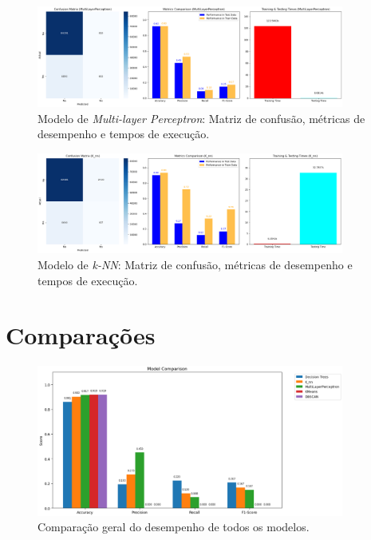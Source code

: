 \begin{figure}[H]
    \centering
    \includegraphics[width=0.9\textwidth]{images/mlp_overview.png}
    \caption{Modelo de \textit{Multi-layer Perceptron}: Matriz de confusão, métricas de desempenho e tempos de execução.}
    \label{fig:mlp_overview}
\end{figure}

\begin{figure}[H]
    \centering
    \includegraphics[width=0.9\textwidth]{images/knn_overview.png}
    \caption{Modelo de \textit{k-NN}: Matriz de confusão, métricas de desempenho e tempos de execução.}
    \label{fig:knn_overview}
\end{figure}

\section{Comparações}
\label{chap:comparacoes}

\begin{figure}[H]
    \centering
    \includegraphics[width=0.9\textwidth]{images/model_comparison.png}
    \caption{Comparação geral do desempenho de todos os modelos.}
    \label{fig:model_comparison}
\end{figure}

